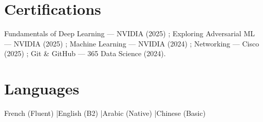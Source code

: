 \documentclass[a4paper,9pt]{article}
\begin{document}
\section{Certifications}
Fundamentals of Deep Learning --- NVIDIA (2025) ; Exploring Adversarial ML --- NVIDIA (2025) ; Machine Learning --- NVIDIA (2024) ; Networking --- Cisco (2025) ; Git \& GitHub --- 365 Data Science (2024).
\section{Languages}
French (Fluent) \quad|\quad English (B2) \quad|\quad Arabic (Native) \quad|\quad Chinese (Basic)
\end{document}
